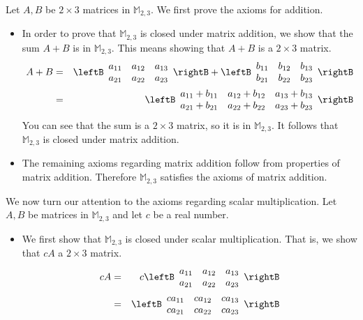 \begin{solution}
Let $A, B$ be $2 \times 3$ matrices in $\mathbb{M}_{2,3}$. We first prove the axioms for addition.

\begin{itemize}
\item
In order to prove that $\mathbb{M}_{2,3}$ is closed under matrix addition, we show that the sum $A+B$ is in $\mathbb{M}_{2,3}$. This means showing that $A+B$ is a $2 \times 3$ matrix. 
\begin{eqnarray*}
A+B &=& \leftB \begin{array}{rrr}
a_{11} & a_{12} & a_{13}\\
a_{21} & a_{22} & a_{23}
\end{array} \rightB + \leftB \begin{array}{rrr}
b_{11} & b_{12} & b_{13}\\
b_{21} & b_{22} & b_{23}
\end{array} \rightB \\
&=& \leftB \begin{array}{rrr}
a_{11} + b_{11} & a_{12}+b_{12} & a_{13}+b_{13}\\
a_{21} +b_{21}& a_{22}+b_{22} & a_{23}+b_{23}
\end{array} \rightB
\end{eqnarray*}
You can see that the sum is a $2\times 3$ matrix, so it is in $\mathbb{M}_{2,3}$. It follows that $\mathbb{M}_{2,3}$ is closed under matrix addition. 

\item 
The remaining axioms regarding matrix addition follow from properties of matrix addition. Therefore $\mathbb{M}_{2,3}$ satisfies the axioms of matrix addition.
\end{itemize}

We now turn our attention to the axioms regarding scalar multiplication. Let $A, B$ be matrices in $\mathbb{M}_{2,3}$ and let $c$ be a real number.

\begin{itemize}
\item
We first show that $\mathbb{M}_{2,3}$ is closed under scalar multiplication. That is, we show that $cA$ a $2 \times 3$ matrix.
\begin{eqnarray*}
cA &=& c\leftB \begin{array}{rrr}
a_{11} & a_{12} & a_{13}\\
a_{21} & a_{22} & a_{23}
\end{array} \rightB \\
&=& \leftB \begin{array}{rrr}
ca_{11} & ca_{12} & ca_{13}\\
ca_{21} & ca_{22} & ca_{23}
\end{array} \rightB
\end{eqnarray*}


\end{itemize}
\end{solution}
